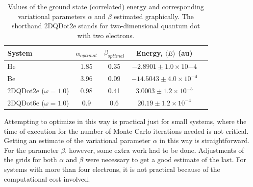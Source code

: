 \begin{table}[!hbt]
\centering
\begin{tabular}{lcccr}
\toprule[1pt]
\textbf{System} & $\alpha_{optimal}$ & $\beta_{optimal}$ & \textbf{Energy}, $\langle E \rangle$ (au) \\
\midrule[1pt]
He  		&  1.85 	&   0.35 	& $-2.8901 \pm 1.0 \times 10{-4}$ \\
Be  		&  3.96		&   0.09	& $-14.5043 \pm 4.0 \times 10^{-4}$\\
2DQDot2e ($\omega=1.0$)	& 0.98	& 0.41  & $3.0003 \pm 1.2 \times 10^{-5}$ \\
2DQDot6e ($\omega = 1.0$)	& 0.9   & 0.6	& $20.19 \pm 1.2 \times 10^{-4}$\\
\bottomrule[1pt]
\end{tabular}\caption{Values of the ground state (correlated) energy and corresponding variational parameters  $\alpha$ and $\beta$ estimated graphically. The shorthand 2DQDot2e stands for two-dimensional quantum dot with two electrons.}
\label{energiesWithGraphPar}
\end{table}

\noindent
Attempting to optimize in this way is practical just for small systems, where the time of execution for the number of Monte Carlo iterations needed is not critical. Getting an estimate of the variational parameter $\alpha$ in this way is straightforward. For the parameter $\beta$, however, some extra work had to be done. Adjustments of the grids for both $\alpha$ and $\beta$ were necessary to get a good estimate of the last. For systems with more than four electrons, it is not practical because of the computational cost involved.

